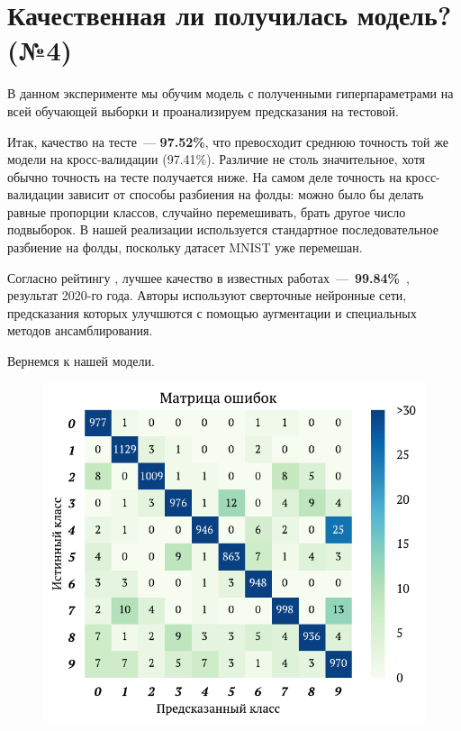 \documentclass[12pt]{article}
\begin{document}
\section{Качественная ли получилась модель? (№4)}

В данном эксперименте мы обучим модель с полученными гиперпараметрами на всей обучающей выборки и проанализируем предсказания на тестовой.

Итак, качество на тесте~--- \textbf{97.52\%}, что превосходит среднюю точность той же модели на кросс-валидации (97.41\%). Различие не столь значительное, хотя обычно точность на тесте получается ниже. На самом деле точность на кросс-валидации  зависит от способы разбиения на фолды: можно было бы делать равные пропорции классов, случайно перемешивать, брать другое число подвыборок. В нашей реализации используется стандартное последовательное разбиение на фолды, поскольку датасет MNIST уже перемешан. 

Согласно рейтингу \cite{topmnist}, лучшее качество в известных работах~---~\textbf{99.84\%}~\cite{byerly2020branching}, \mbox{результат} 2020-го года. Авторы используют сверточные нейронные сети, предсказания которых улучшются с помощью аугментации и специальных методов ансамблирования.

Вернемся к нашей модели.

\begin{figure}[h]
    \centering
    \includegraphics{4_conf}
    \caption{}
    \label{fig:conf_bl}
\end{figure}
\end{document}
